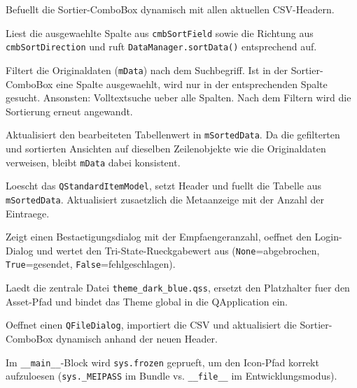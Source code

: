 \documentclass[12pt, a4paper]{article}
\begin{document}
\begin{description}[style=nextline, leftmargin=1.5em]
    \item[\texttt{\_createRadioButtons()}]
        Befuellt die Sortier-ComboBox dynamisch mit allen aktuellen CSV-Headern.
    \item[\texttt{SortColumn()}]
        Liest die ausgewaehlte Spalte aus \texttt{cmbSortField} sowie die
        Richtung aus \texttt{cmbSortDirection} und ruft
        \texttt{DataManager.sortData()} entsprechend auf.
    \item[\texttt{Search(aText)}]
        Filtert die Originaldaten (\texttt{mData}) nach dem Suchbegriff.
        Ist in der Sortier-ComboBox eine Spalte ausgewaehlt, wird nur in der
        entsprechenden Spalte gesucht. Ansonsten: Volltextsuche ueber alle Spalten.
        Nach dem Filtern wird die Sortierung erneut angewandt.
    \item[\texttt{CellEdited(aItem)}]
        Aktualisiert den bearbeiteten Tabellenwert in \texttt{mSortedData}.
        Da die gefilterten und sortierten Ansichten auf dieselben Zeilenobjekte
        wie die Originaldaten verweisen, bleibt \texttt{mData} dabei konsistent.
    \item[\texttt{FillTable()}]
        Loescht das \texttt{QStandardItemModel}, setzt Header und fuellt die
        Tabelle aus \texttt{mSortedData}. Aktualisiert zusaetzlich die
        Metaanzeige mit der Anzahl der Eintraege.
    \item[\texttt{SendMails()}]
        Zeigt einen Bestaetigungsdialog mit der Empfaengeranzahl, oeffnet den
        Login-Dialog und wertet den Tri-State-Rueckgabewert aus
        (\texttt{None}=abgebrochen, \texttt{True}=gesendet,
        \texttt{False}=fehlgeschlagen).
    \item[\texttt{\_load\_app\_theme()}]
        Laedt die zentrale Datei \texttt{theme\_dark\_blue.qss}, ersetzt den
        Platzhalter fuer den Asset-Pfad und bindet das Theme global in die
        QApplication ein.
    \item[\texttt{ImportFile()}]
        Oeffnet einen \texttt{QFileDialog}, importiert die CSV und
        aktualisiert die Sortier-ComboBox dynamisch anhand der neuen Header.
\end{description}

\begin{warnbox}
Im \texttt{\_\_main\_\_}-Block wird \texttt{sys.frozen} geprueft, um den
Icon-Pfad korrekt aufzuloesen (\texttt{sys.\_MEIPASS} im Bundle vs.
\texttt{\_\_file\_\_} im Entwicklungsmodus).
\end{warnbox}
\end{document}
